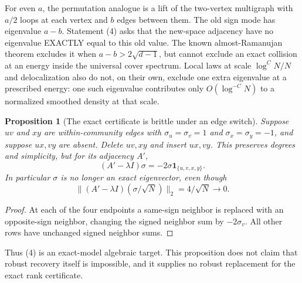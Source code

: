 \documentclass[11pt]{article}
\newtheorem{proposition}{Proposition}
\newcommand{\one}{\mathbf 1}
\begin{document}
For even $a$, the permutation analogue is a lift of the two-vertex
multigraph with $a/2$ loops at each vertex and $b$ edges between them.
The old sign mode has eigenvalue $a-b$. Statement (4) asks that the
new-space adjacency have no eigenvalue EXACTLY equal to this old value.
The known almost-Ramanujan theorem excludes it when $a-b>2\sqrt{d-1}$,
but cannot exclude an exact collision at an energy inside the universal
cover spectrum. Local laws at scale $\log^C N/N$ and delocalization
also do not, on their own, exclude one extra eigenvalue at a prescribed
energy: one such eigenvalue contributes only $O(\log^{-C}N)$ to a
normalized smoothed density at that scale.

\begin{proposition}[The exact certificate is brittle under an edge switch]
Suppose $uv$ and $xy$ are within-community edges with
$\sigma_u=\sigma_v=1$ and $\sigma_x=\sigma_y=-1$, and suppose $ux,vy$
are absent. Delete $uv,xy$ and insert $ux,vy$. This preserves degrees and
simplicity, but for its adjacency $A'$,
\[
 (A'-\lambda I)\sigma=-2\sigma\one_{\{u,v,x,y\}}.  \tag{5}
\]
In particular $\sigma$ is no longer an exact eigenvector, even though
\[
 \|(A'-\lambda I)(\sigma/\sqrt N)\|_2=4/\sqrt N\longrightarrow0.
\]
\end{proposition}
\begin{proof}
At each of the four endpoints a same-sign neighbor is replaced with an
opposite-sign neighbor, changing the signed neighbor sum by $-2\sigma_v$.
All other rows have unchanged signed neighbor sums.
\end{proof}

Thus (4) is an exact-model algebraic target. This proposition does not
claim that robust recovery itself is impossible, and it supplies no
robust replacement for the exact rank certificate.
\end{document}
